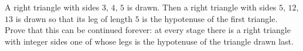 A right triangle with sides $3$, $4$, $5$ is drawn. Then a right triangle with sides $5$, $12$, $13$ is drawn so that its leg of length $5$ is the hypotenuse of the first triangle. Prove that this can be continued forever: at every stage there is a right triangle with integer sides one of whose legs is the hypotenuse of the triangle drawn last.
